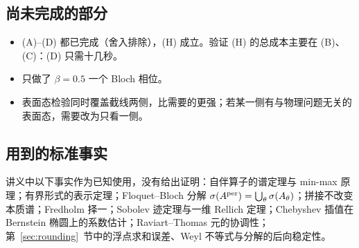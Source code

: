 \documentclass[11pt,a4paper,fontset=fandol]{ctexart}
\begin{document}
\subsection{尚未完成的部分}

\begin{itemize}
\item (A)--(D) 都已完成（舍入排除），(H) 成立。验证 (H) 的总成本主要在 (B)、(C)：(D) 只需十几秒。
\item 只做了 $\beta=0.5$ 一个 Bloch 相位。
\item 表面态检验同时覆盖截线两侧，比需要的更强；若某一侧有与物理问题无关的表面态，需要改为只看一侧。
\end{itemize}

\subsection{用到的标准事实}

讲义中以下事实作为已知使用，没有给出证明：自伴算子的谱定理与 min-max 原理；有界形式的表示定理；Floquet--Bloch 分解 $\sigma(A^{\rm per})=\bigcup_\theta\sigma(A_\theta)$；拼接不改变本质谱；Fredholm 择一；Sobolev 迹定理与一维 Rellich 定理；Chebyshev 插值在 Bernstein 椭圆上的系数估计；Raviart--Thomas 元的协调性；第~\ref{sec:rounding}~节中的浮点求和误差、Weyl 不等式与分解的后向稳定性。
\end{document}

